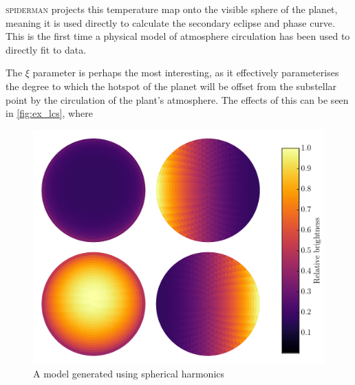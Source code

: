 \documentclass[a4paper,fleqn,usenatbib]{mnras}
\begin{document}
\textsc{spiderman} projects this temperature map onto the visible sphere of the planet, meaning it is used directly to calculate the secondary eclipse and phase curve. This is the first time a physical model of atmosphere circulation has been used to directly fit to data.

The $\xi$ parameter is perhaps the most interesting, as it effectively parameterises the degree to which the hotspot of the planet will be offset from the substellar point by the circulation of the plant's atmosphere. The effects of this can be seen in \ref{fig:ex_lcs}, where

\begin{figure}
\begin{center}
\includegraphics[width=\columnwidth]{img/sphere_quad.pdf}
\caption{A model generated using spherical harmonics}
\label{fig:harmonics}
\end{center}
\end{figure}
\end{document}
